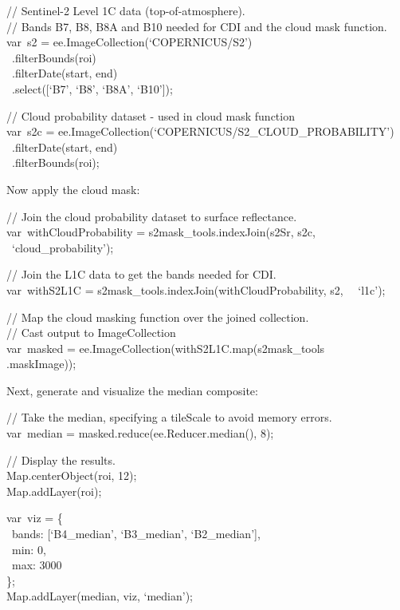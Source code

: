 \documentclass[
  letterpaper,
  DIV=11,
  numbers=noendperiod]{scrreprt}
\begin{document}
// Sentinel-2 Level 1C data (top-of-atmosphere). ~\\
// Bands B7, B8, B8A and B10 needed for CDI and the cloud mask
function.\\
var~s2 = ee.ImageCollection(`COPERNICUS/S2')\\
\hspace*{0.333em} ~.filterBounds(roi)\\
\hspace*{0.333em} ~.filterDate(start, end)\\
\hspace*{0.333em} ~.select({[}`B7', `B8', `B8A', `B10'{]});

// Cloud probability dataset - used in cloud mask function\\
var~s2c = ee.ImageCollection(`COPERNICUS/S2\_CLOUD\_PROBABILITY')\\
\hspace*{0.333em} ~.filterDate(start, end)\\
\hspace*{0.333em} ~.filterBounds(roi);

Now apply the cloud mask:

// Join the cloud probability dataset to surface reflectance.\\
var~withCloudProbability = s2mask\_tools.indexJoin(s2Sr, s2c,~
~`cloud\_probability');

// Join the L1C data to get the bands needed for CDI.\\
var~withS2L1C = s2mask\_tools.indexJoin(withCloudProbability, s2,~
~`l1c');

// Map the cloud masking function over the joined collection.\\
// Cast output to ImageCollection\\
var~masked = ee.ImageCollection(withS2L1C.map(s2mask\_tools\\
.maskImage));

Next, generate and visualize the median composite:

// Take the median, specifying a tileScale to avoid memory errors.\\
var~median = masked.reduce(ee.Reducer.median(), 8);

// Display the results.\\
Map.centerObject(roi, 12);\\
Map.addLayer(roi);

var~viz = \{\\
\hspace*{0.333em} ~bands: {[}`B4\_median', `B3\_median',
`B2\_median'{]},\\
\hspace*{0.333em} ~min: 0,\\
\hspace*{0.333em} ~max: 3000\\
\};\\
Map.addLayer(median, viz, `median');
\end{document}
